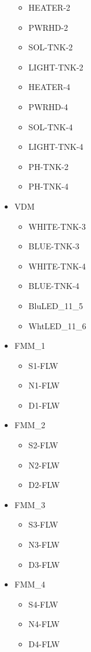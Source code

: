 \documentclass[
]{book}
\providecommand{\tightlist}{%
  \setlength{\itemsep}{0pt}\setlength{\parskip}{0pt}}
\begin{document}
\begin{itemize}
  \begin{itemize}
  \tightlist
  \item
    HEATER-2
  \item
    PWRHD-2
  \item
    SOL-TNK-2
  \item
    LIGHT-TNK-2
  \item
    HEATER-4
  \item
    PWRHD-4
  \item
    SOL-TNK-4
  \item
    LIGHT-TNK-4
  \item
    PH-TNK-2
  \item
    PH-TNK-4
  \end{itemize}
\item
  VDM

  \begin{itemize}
  \tightlist
  \item
    WHITE-TNK-3
  \item
    BLUE-TNK-3
  \item
    WHITE-TNK-4
  \item
    BLUE-TNK-4
  \item
    BluLED\_11\_5
  \item
    WhtLED\_11\_6
  \end{itemize}
\item
  FMM\_1

  \begin{itemize}
  \tightlist
  \item
    S1-FLW
  \item
    N1-FLW
  \item
    D1-FLW
  \end{itemize}
\item
  FMM\_2

  \begin{itemize}
  \tightlist
  \item
    S2-FLW
  \item
    N2-FLW
  \item
    D2-FLW
  \end{itemize}
\item
  FMM\_3

  \begin{itemize}
  \tightlist
  \item
    S3-FLW
  \item
    N3-FLW
  \item
    D3-FLW
  \end{itemize}
\item
  FMM\_4

  \begin{itemize}
  \tightlist
  \item
    S4-FLW
  \item
    N4-FLW
  \item
    D4-FLW
  \end{itemize}
\end{itemize}
\end{document}
